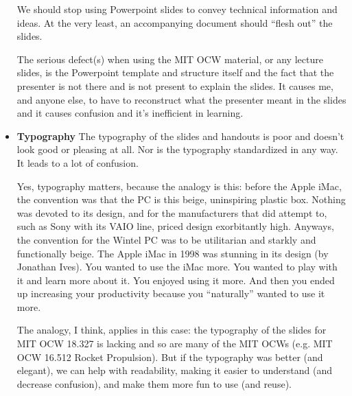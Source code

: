 \documentclass[twoside]{amsart}
\theoremstyle{plain}
\theoremstyle{definition}
\theoremstyle{remark}
\numberwithin{equation}{section}
\begin{document}
\begin{itemize}
We should stop using Powerpoint slides to convey technical information and ideas. At the very least, an accompanying document should ``flesh out'' the slides.  

The serious defect(s) when using the MIT OCW material, or any lecture slides, is the Powerpoint template and structure itself and the fact that the presenter is not there and is not present to explain the slides.  It causes me, and anyone else, to have to reconstruct what the presenter meant in the slides and it causes confusion and it's inefficient in learning.  %
\item \textbf{Typography} The typography of the slides and handouts is poor and doesn't look good or pleasing at all.  Nor is the typography standardized in any way.  It leads to a lot of confusion. 

Yes, typography matters, because the analogy is this: before the Apple iMac, the convention was that the PC is this beige, uninspiring plastic box.  Nothing was devoted to its design, and for the manufacturers that did attempt to, such as Sony with its VAIO line, priced design exorbitantly high.  Anyways, the convention for the Wintel PC was to be utilitarian and starkly and functionally beige.  The Apple iMac in 1998 was stunning in its design (by Jonathan Ives).  You wanted to use the iMac more.  You wanted to play with it and learn more about it.  You enjoyed using it more.  And then you ended up increasing your productivity because you ``naturally'' wanted to use it more.  

The analogy, I think, applies in this case: the typography of the slides for MIT OCW 18.327 is lacking and so are many of the MIT OCWs (e.g. MIT OCW 16.512 Rocket Propulsion).  But if the typography was better (and elegant), we can help with readability, making it easier to understand (and decrease confusion), and make them more fun to use (and reuse).  


\end{itemize}
\end{document}
